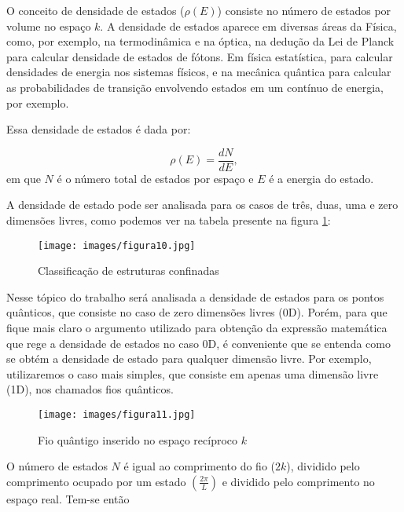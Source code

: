 \par O conceito de densidade de estados ($\rho(E)$) consiste no número de estados por volume no espaço $k$. A densidade de estados aparece em diversas áreas da Física, como, por exemplo, na termodinâmica e na óptica, na dedução da Lei de Planck para calcular densidade de estados de fótons. Em física estatística, para calcular densidades de energia nos sistemas físicos, e na mecânica quântica para calcular as probabilidades de transição envolvendo estados em um contínuo de energia, por exemplo\cite{confinamento2}.

\par Essa densidade de estados é dada por:

\begin{equation}
	\label{confinamento_2}
	\rho(E) = \frac{dN}{dE},
\end{equation}
em que $N$ é o número total de estados por espaço e $E$ é a energia do estado.

\par A densidade de estado pode ser analisada para os casos de três, duas, uma e zero dimensões livres, como podemos ver na tabela presente na figura \ref{fig10}:

\begin{figure}[H]
  \caption{Classificação de estruturas confinadas}
  \centering
  \texttt{[image: images/figura10.jpg]}
  \label{fig10}
\end{figure}

\par Nesse tópico do trabalho será analisada a densidade de estados para os pontos quânticos, que consiste no caso de zero dimensões livres (0D). Porém, para que fique mais claro o argumento utilizado para obtenção da expressão matemática que rege a densidade de estados no caso 0D, é conveniente que se entenda como se obtém a densidade de estado para qualquer dimensão livre. Por exemplo, utilizaremos o caso mais simples, que consiste em apenas uma dimensão livre (1D), nos chamados fios quânticos.

\begin{figure}[H]
  \caption{Fio quântigo inserido no espaço recíproco $k$\cite{confinamento3}}
  \centering
  \texttt{[image: images/figura11.jpg]}
  \label{fig11}
\end{figure}

\par O número de estados $N$ é igual ao comprimento do fio ($2k$), dividido pelo comprimento ocupado por um estado $\left(\frac{2\pi}{L}\right)$ e dividido pelo comprimento no espaço real. Tem-se\cite{confinamento3} então

